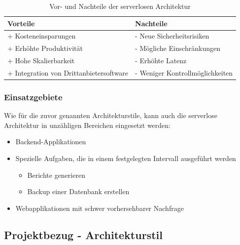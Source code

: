         \begin{table}[H]
            \centering
            \begin{tabular}{|p{7.5cm}|p{7.5cm}|}
                \hline
                \cellcolor{green!40} \textbf{Vorteile} & \cellcolor{red!40} \textbf{Nachteile} \\ \hline
                 + Kosteneinsparungen & - Neue Sicherheitsrisiken \\
                 + Erhöhte Produktivität & - Mögliche Einschränkungen \\ 
                 + Hohe Skalierbarkeit & - Erhöhte Latenz \\
                 + Integration von Drittanbietersoftware & - Weniger Kontrollmöglichkeiten \\
                \hline
            \end{tabular}
            \caption{Vor- und Nachteile der serverlosen Architektur}
            \label{tab:serverless-architecture-pros-and-cons}
        \end{table}
        \cite{EA:Web66}
    
    
        \subsubsection{Einsatzgebiete}

        Wie für die zuvor genannten Architekturstile, kann auch die serverlose Architektur in unzähligen Bereichen eingesetzt werden:
        \begin{itemize}
            \item Backend-Applikationen
            \item Spezielle Aufgaben, die in einem festgelegten Intervall ausgeführt werden
            \begin{itemize}[label=$\circ$]
                \item Berichte generieren
                \item Backup einer Datenbank erstellen
            \end{itemize}
            \item Webapplikationen mit schwer vorhersehbarer Nachfrage
        \end{itemize}
        \cite{EA:Web65}

    \clearpage


    
    \subsection{Projektbezug - Architekturstil} \label{Projektbezug - Architekturstil}

